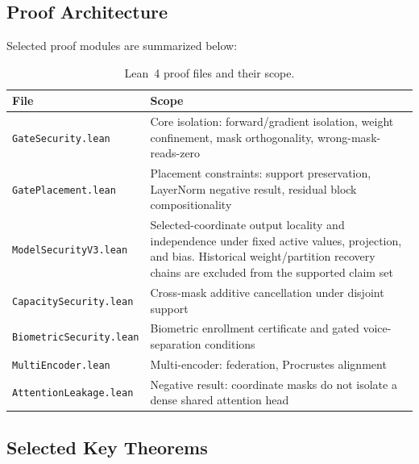 \documentclass[11pt,a4paper]{article}
\begin{document}
\subsection{Proof Architecture}

Selected proof modules are summarized below:

\begin{table}[ht]
\centering
\caption{Lean~4 proof files and their scope.}
\label{tab:proof-files}
\begin{tabular}{@{}p{4.5cm}p{8.5cm}@{}}
\toprule
\textbf{File} & \textbf{Scope} \\
\midrule
\texttt{GateSecurity.lean} &
Core isolation: forward/gradient isolation, weight confinement,
mask orthogonality, wrong-mask-reads-zero \\
\texttt{GatePlacement.lean} &
Placement constraints: support preservation, LayerNorm negative
result, residual block compositionality \\
\texttt{ModelSecurityV3.lean} &
Selected-coordinate output locality and independence under fixed active
values, projection, and bias. Historical weight/partition recovery chains
are excluded from the supported claim set \\
\texttt{CapacitySecurity.lean} &
Cross-mask additive cancellation under disjoint support \\
\texttt{BiometricSecurity.lean} &
Biometric enrollment certificate and gated voice-separation conditions \\
\texttt{MultiEncoder.lean} &
Multi-encoder: federation, Procrustes alignment \\
\texttt{AttentionLeakage.lean} &
Negative result: coordinate masks do not isolate a dense shared
attention head \\
\bottomrule
\end{tabular}
\end{table}

\subsection{Selected Key Theorems}
\end{document}
